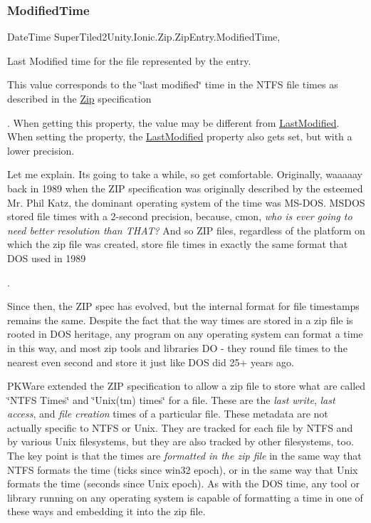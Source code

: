 \subsubsection{\texorpdfstring{Modified\+Time}{ModifiedTime}}
{\footnotesize\ttfamily Date\+Time Super\+Tiled2\+Unity.\+Ionic.\+Zip.\+Zip\+Entry.\+Modified\+Time\hspace{0.3cm}{\ttfamily [get]}, {\ttfamily [set]}}



Last Modified time for the file represented by the entry. 

This value corresponds to the \char`\"{}last modified\char`\"{} time in the N\+T\+FS file times as described in the \mbox{\hyperlink{namespace_super_tiled2_unity_1_1_ionic_1_1_zip}{Zip}} specification

. When getting this property, the value may be different from \mbox{\hyperlink{class_super_tiled2_unity_1_1_ionic_1_1_zip_1_1_zip_entry_acd1234fd27c216b59c166c2b96aba3dd}{Last\+Modified}}. When setting the property, the \mbox{\hyperlink{class_super_tiled2_unity_1_1_ionic_1_1_zip_1_1_zip_entry_acd1234fd27c216b59c166c2b96aba3dd}{Last\+Modified}} property also gets set, but with a lower precision. 

Let me explain. It\textquotesingle{}s going to take a while, so get comfortable. Originally, waaaaay back in 1989 when the Z\+IP specification was originally described by the esteemed Mr. Phil Katz, the dominant operating system of the time was M\+S-\/\+D\+OS. M\+S\+D\+OS stored file times with a 2-\/second precision, because, c\textquotesingle{}mon, {\itshape who is ever going to need better resolution than T\+H\+AT?} And so Z\+IP files, regardless of the platform on which the zip file was created, store file times in exactly the same format that D\+OS used in 1989

. 

Since then, the Z\+IP spec has evolved, but the internal format for file timestamps remains the same. Despite the fact that the way times are stored in a zip file is rooted in D\+OS heritage, any program on any operating system can format a time in this way, and most zip tools and libraries DO -\/ they round file times to the nearest even second and store it just like D\+OS did 25+ years ago. 

P\+K\+Ware extended the Z\+IP specification to allow a zip file to store what are called \char`\"{}\+N\+T\+F\+S Times\char`\"{} and \char`\"{}\+Unix(tm) times\char`\"{} for a file. These are the {\itshape last write}, {\itshape last access}, and {\itshape file creation} times of a particular file. These metadata are not actually specific to N\+T\+FS or Unix. They are tracked for each file by N\+T\+FS and by various Unix filesystems, but they are also tracked by other filesystems, too. The key point is that the times are {\itshape formatted in the zip file} in the same way that N\+T\+FS formats the time (ticks since win32 epoch), or in the same way that Unix formats the time (seconds since Unix epoch). As with the D\+OS time, any tool or library running on any operating system is capable of formatting a time in one of these ways and embedding it into the zip file. 

